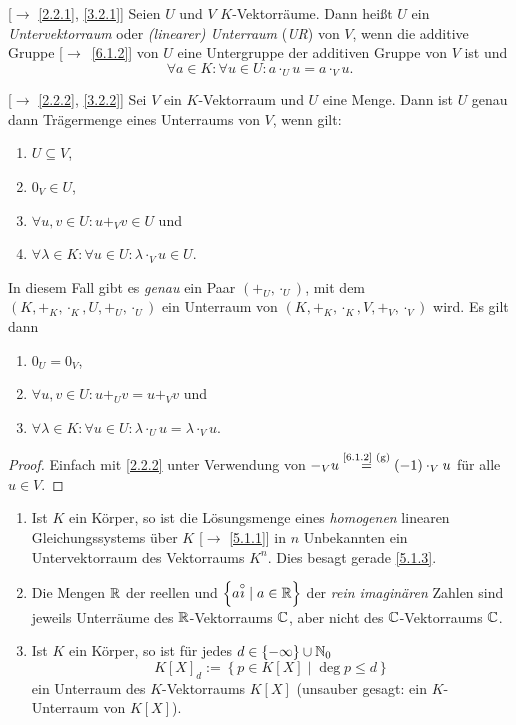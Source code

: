 \documentclass[../../main.tex]{subfiles}
\begin{document}

\begin{df}\mbox{}\label{6.1.9}
[$\to$ \ref{2.2.1}, \ref{3.2.1}] Seien $U$ und $V$ $K$-Vektorräume. Dann heißt $U$ ein \emph{Untervektorraum} oder \emph{(linearer) Unterraum} (\emph{UR}) von $V$, wenn die additive Gruppe [$\to$~\ref{6.1.2}] von $U$ eine Untergruppe der additiven Gruppe von $V$ ist und
\[\forall a\in K:\forall u\in U: a\cdot_U u = a\cdot_V u.\]
\end{df}

\begin{pro}\label{6.1.10}
{\rm[$\to$ \ref{2.2.2}, \ref{3.2.2}]} Sei $V$ ein $K$-Vektorraum und $U$ eine Menge. Dann ist $U$ genau dann Trägermenge eines Unterraums von $V$, wenn gilt:
\begin{enumerate}[\rm(a)]
\item $U\subseteq V$,
\item $0_V\in U$,
\item $\forall u,v\in U: u +_V v \in U$ und
\item $\forall \lambda\in K:\forall u\in U:\lambda \cdot_V u \in U$.
\end{enumerate}
In diesem Fall gibt es \emph{genau} ein Paar $(+_U,\cdot_U)$, mit dem $(K,+_K,\cdot_K,U,+_U,\cdot_U)$ ein Unterraum von $(K,+_K,\cdot_K, V, +_V,\cdot_V)$ wird. Es gilt dann
\begin{enumerate}[\rm(a')]
\item $0_U = 0_V$,
\item $\forall u,v\in U:u+_U v = u+_V v$ und
\item $\forall \lambda\in K:\forall u\in U:\lambda\cdot_Uu= \lambda\cdot_Vu$.
\end{enumerate}
\end{pro}
\begin{proof}
Einfach mit \ref{2.2.2} unter Verwendung von $-_V u\overset{\text{\ref{6.1.2} (g)}}{=} (-1)\cdot_V u$ für alle $u\in V$.
\end{proof}

\begin{bsp}\label{6.1.11}
\begin{enumerate}[\normalfont(a)]
\item Ist $K$ ein Körper, so ist die Lösungsmenge eines \emph{homogenen} linearen Gleichungssystems über $K$ [$\to$ \ref{5.1.1}] in $n$ Unbekannten ein Untervektorraum des Vektorraums $K^n$. Dies besagt gerade \ref{5.1.3}.
\item Die Mengen $\mathbb R$ der reellen und $\left\{a\overset\circ\imath\mid a\in\mathbb R\right\}$ der \emph{rein imaginären} Zahlen sind jeweils Unterräume des $\mathbb R$-Vektorraums $\mathbb C$, aber nicht des $\mathbb C$-Vektorraums $\mathbb C$.
\item Ist $K$ ein Körper, so ist für jedes $d\in\left\{-\infty\right\}\cup \mathbb N_0$
\[K[X]_d := \left\{p\in K[X]\mid\deg p\le d\right\}\]
ein Unterraum des $K$-Vektorraums $K[X]$ (unsauber gesagt: ein $K$-Unterraum von $K[X]$).
\end{enumerate}
\end{bsp}
\end{document}
